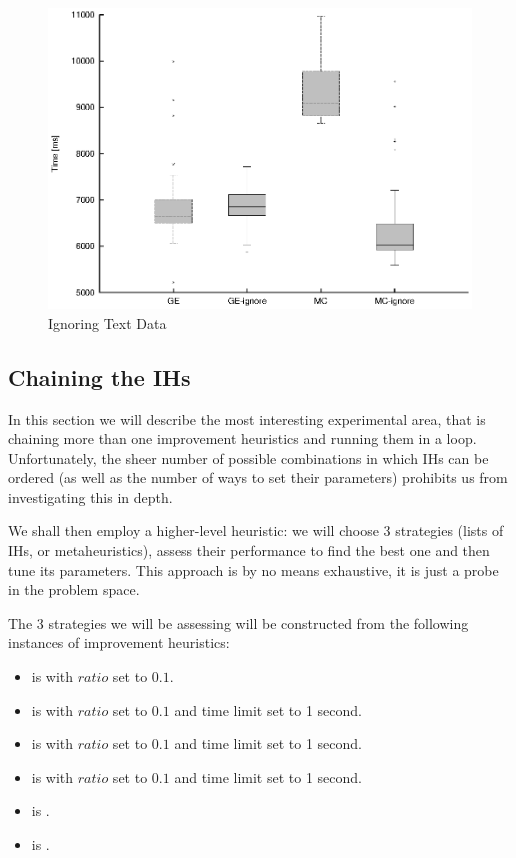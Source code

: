 \begin{figure}
  \caption{Ignoring Text Data}
  \label{image-experiment-ignore-text-data}
  \centering
    \includegraphics[width=\textwidth]{images/experiments/ignore-text-data}
\end{figure}

\subsection{Chaining the IHs}


In this section we will describe the most interesting experimental area, that is chaining more than one improvement heuristics and running them in a loop. Unfortunately, the sheer number of possible combinations in which IHs can be ordered (as well as the number of ways to set their parameters) prohibits us from investigating this in depth.

We shall then employ a higher-level heuristic: we will choose 3 strategies (lists of IHs, or metaheuristics), assess their performance to find the best one and then tune its parameters. This approach is by no means exhaustive, it is just a probe in the problem space.

The 3 strategies we will be assessing will be constructed from the following instances of improvement heuristics:

\begin{itemize}
	\item {} is  with $ratio$ set to $0.1$.
	\item {} is  with $ratio$ set to $0.1$ and time limit set to 1 second.
	\item {} is  with $ratio$ set to $0.1$ and time limit set to 1 second.
	\item {} is  with $ratio$ set to $0.1$ and time limit set to 1 second.
	\item {} is .
	\item {} is .
\end{itemize}

